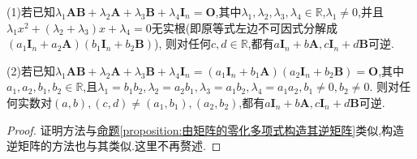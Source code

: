 \documentclass[../../main.tex]{subfiles}%
\begin{document}
\begin{proposition}\label{proposition:由矩阵等式构造逆矩阵}
(1)若已知\(\lambda _1\boldsymbol{AB}+\lambda _2\boldsymbol{A}+\lambda _3\boldsymbol{B}+\lambda _4\boldsymbol{I}_n=\boldsymbol{O}\),其中\(\lambda_1,\lambda_2,\lambda_3,\lambda_4\in\mathbb{R}\),$\lambda_1\ne 0$,并且$\lambda_1x^2+(\lambda_2+\lambda_3)x+\lambda_4=0$无实根(即原等式左边不可因式分解成$\left( a_1\boldsymbol{I}_n+a_2\boldsymbol{A} \right) \left( b_1\boldsymbol{I}_n+b_2\boldsymbol{B} \right)$),
则对任何$c,d\in\mathbb{R}$,都有\(a\boldsymbol{I}_n+b\boldsymbol{A},c\boldsymbol{I}_n+d\boldsymbol{B}\)可逆.

(2)若已知\(\lambda _1\boldsymbol{AB}+\lambda _2\boldsymbol{A}+\lambda _3\boldsymbol{B}+\lambda _4\boldsymbol{I}_n=\left( a_1\boldsymbol{I}_n+b_1\boldsymbol{A} \right) \left( a_2\boldsymbol{I}_n+b_2\boldsymbol{B} \right) =\boldsymbol{O}\),其中\(a_1,a_2,b_1,b_2\in\mathbb{R}\),且\(\lambda _1=b_1b_2,\lambda _2=a_2b_1,\lambda _3=a_1b_2,\lambda _4=a_1a_2,b_1\ne 0,b_2\ne 0\).
则对任何实数对\(\left( a,b \right),\left( c,d \right) \ne \left( a_1,b_1 \right) ,\left( a_2,b_2 \right)\),都有\(a\boldsymbol{I}_n+b\boldsymbol{A},c\boldsymbol{I}_n+d\boldsymbol{B}\)可逆.
\end{proposition}
\begin{proof}
证明方法与\hyperref[proposition:由矩阵的零化多项式构造其逆矩阵]{命题\ref{proposition:由矩阵的零化多项式构造其逆矩阵}}类似,构造逆矩阵的方法也与其类似.这里不再赘述.
\end{proof}
\end{document}
